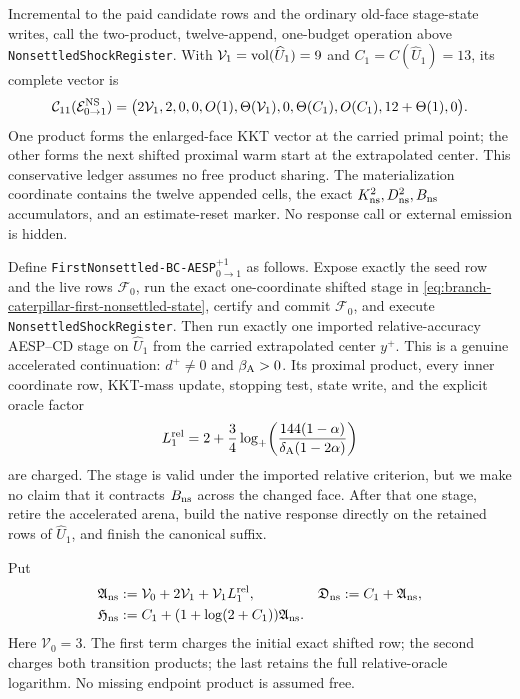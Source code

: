 Incremental to the paid candidate rows and the ordinary old-face stage-state
writes, call the two-product, twelve-append, one-budget operation above
\texttt{NonsettledShockRegister}.  With
$\mathcal V_1=\operatorname{vol}(\widehat U_1)=9$ and $C_1=C(\widehat U_1)=13$, its complete
vector is
\begin{equation}
 \mathcal C_{11}(\mathcal E_{0\to1}^{\rm NS})=
 \bigl(2\mathcal V_1,2,0,0,O(1),\Theta(\mathcal V_1),0,
 \Theta(C_1),O(C_1),12+\Theta(1),0\bigr).
 \label{eq:branch-caterpillar-nonsettled-transition-vector}
\end{equation}
One product forms the enlarged-face KKT vector at the carried primal point;
the other forms the next shifted proximal warm start at the extrapolated
center.  This conservative ledger assumes no free product sharing.  The
materialization coordinate contains the twelve appended cells, the exact
$K_{\rm ns}^2,D_{\rm ns}^2,B_{\rm ns}$ accumulators, and an estimate-reset
marker.  No response call or external emission is hidden.

Define \texttt{FirstNonsettled-BC-AESP}$_{0\to1}^{+1}$ as follows.  Expose
exactly the seed row and the live rows $\mathcal F_0$, run the exact
one-coordinate shifted stage in
\cref{eq:branch-caterpillar-first-nonsettled-state}, certify and commit
$\mathcal F_0$, and execute \texttt{NonsettledShockRegister}.  Then run
exactly one imported relative-accuracy AESP--CD stage on $\widehat U_1$ from
the carried extrapolated center $y^+$.  This is a genuine accelerated
continuation: $d^+\ne0$ and $\beta_{\rm A}>0$.  Its proximal product, every
inner coordinate row, KKT-mass update, stopping test, state write, and the
explicit oracle factor
\begin{equation}
 L_1^{\rm rel}=2+\frac34\log_+\!\left(
 \frac{144(1-\alpha)}{\delta_{\rm A}(1-2\alpha)}\right)
 \label{eq:branch-caterpillar-nonsettled-oracle-log}
\end{equation}
are charged.  The stage is valid under the imported relative criterion, but
we make no claim that it contracts $B_{\rm ns}$ across the changed face.
After that one stage, retire the accelerated arena, build the native response
directly on the retained rows of $\widehat U_1$, and finish the canonical
suffix.

Put
\begin{align}
 \mathfrak A_{\rm ns}
 &:=\mathcal V_0+2\mathcal V_1+\mathcal V_1L_1^{\rm rel},
 &\mathfrak D_{\rm ns}&:=C_1+\mathfrak A_{\rm ns},
 \notag\\
 \mathfrak H_{\rm ns}
 &:=C_1+(1+\log(2+C_1))\mathfrak A_{\rm ns}.
 \label{eq:branch-caterpillar-nonsettled-budgets}
\end{align}
Here $\mathcal V_0=3$.  The first term charges the initial exact shifted
row; the second charges both transition products; the last retains the full
relative-oracle logarithm.  No missing endpoint product is assumed free.

